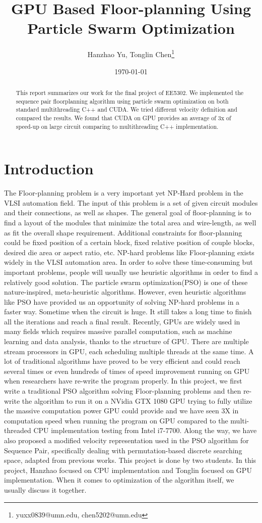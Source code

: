 \documentclass{article}
\author{Hanzhao Yu, Tonglin Chen\thanks{yuxx0839@umn.edu, chen5202@umn.edu}}
\date{\today}
\title{GPU Based Floor-planning Using Particle Swarm Optimization}
\begin{document}
\maketitle
\begin{abstract}
This report summarizes our work for the final project of EE5302. We
implemented the sequence pair floorplanning algorithm using particle
swarm optimization on both standard multithreading C++ and CUDA. We tried
different velocity definition and compared the results. We found that 
CUDA on GPU provides an average of 3x of speed-up on large circuit 
comparing to multithreading C++ implementation.
\end{abstract}
\section{Introduction}
\label{sec:orgb5f1c7b}
The Floor-planning problem is a very important yet NP-Hard problem in the VLSI automation field. The input of this problem is a set of given circuit modules and their connections, as well as shapes. The general goal of floor-planning is to find a layout of the modules that minimize the total area and wire-length, as well as fit the overall shape requirement. Additional constraints for floor-planning could be fixed position of a certain block, fixed relative position of couple blocks, desired die area or aspect ratio, etc.  NP-hard problems like Floor-planning exists widely in the VLSI automation area. In order to solve these time-consuming but important problems, people will usually use heuristic algorithms in order to find a relatively good solution. The particle swarm optimization(PSO) is one of these nature-inspired, meta-heuristic algorithms. However, even heuristic algorithms like PSO have provided us an opportunity of solving NP-hard problems in a faster way. Sometime when the circuit is huge. It still takes a long time to finish all the iterations and reach a final result.
Recently, GPUs are widely used in many fields which requires massive parallel computation, such as machine learning and data analysis, thanks to the structure of GPU. There are multiple stream processors in GPU, each scheduling multiple threads at the same time. A lot of traditional algorithms have proved to be very efficient and could reach several times or even hundreds of times of speed improvement running on GPU when researchers have re-write the program properly. 
In this project, we first write a traditional PSO algorithm solving Floor-planning problems and then re-write the algorithm to run it on a NVidia GTX 1080 GPU trying to fully utilize the massive computation power GPU could provide and we have seen 3X in computation speed when running the program on GPU compared to the multi-threaded CPU implementation testing from Intel i7-7700. Along the way, we have also proposed a modified velocity representation used in the PSO algorithm for Sequence Pair, specifically dealing with permutation-based discrete searching space, adapted from previous works.
This project is done by two students. In this project,  Hanzhao focused on CPU implementation and Tonglin focused on GPU implementation. When it comes to optimization of the algorithm itself, we usually discuss it together.
\end{document}
